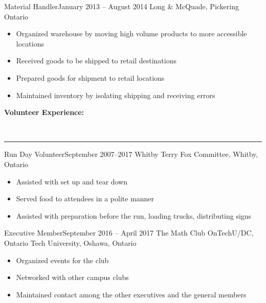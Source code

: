 \documentclass[]{article}
\makeatletter
\newcommand{\heading}[1]
{\begin{large}\textbf{#1}\end{large}\\%
 \rule[1.2ex]{\linewidth}{0.4pt}}
\newenvironment{*subsection}[2]
{
\begin{tabu} to \linewidth {@{}X[l] r}
  \textbf{#1} &
  \textbf{#2}
\end{tabu}
}
{
  \vspace{3mm}
}
\makeatother
\begin{document}
\begin{*subsection}{Material Handler}{January 2013 -- August 2014}
%
Long \& McQuade, Pickering Ontario
%
\begin{itemize}
\item
  Organized warehouse by moving high volume products to more
  accessible locations
\item
  Received goods to be shipped to retail destinations
\item
  Prepared goods for shipment to retail locations
\item
  Maintained inventory by isolating shipping and receiving errors
\end{itemize}
\end{*subsection}
\heading{Volunteer Experience:}
\begin{*subsection}{Run Day Volunteer}{September 2007--2017}
%
Whitby Terry Fox Committee, Whitby, Ontario
%
\begin{itemize}
\item
  Assisted with set up and tear down
\item
  Served food to attendees in a polite manner
\item
  Assisted with preparation before the run, loading trucks,
  distributing signs
\end{itemize}
\end{*subsection}
\begin{*subsection}{Executive Member}{September 2016 -- April 2017}
%
The Math Club OnTechU/DC, Ontario Tech University, Oshawa, Ontario
%
\begin{itemize}
\item
  Organized events for the club
\item
  Networked with other campus clubs
\item
  Maintained contact among the other executives and the general members
\end{itemize}
\end{*subsection}
\end{document}
